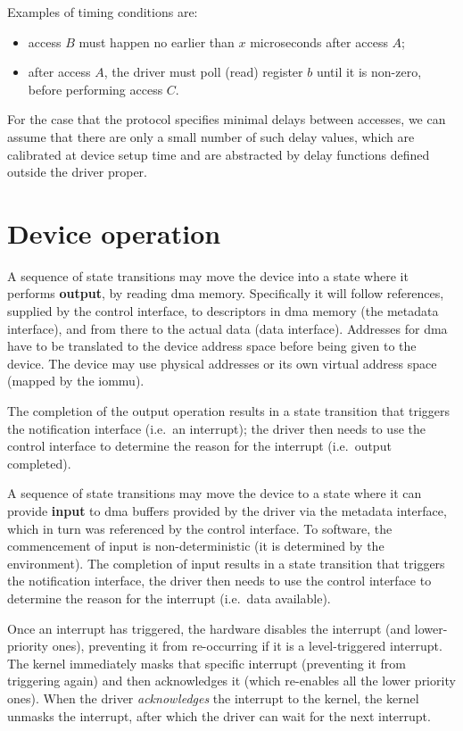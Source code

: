 \documentclass[a4paper,12pt]{report}
\begin{document}
Examples of timing conditions are:
\begin{itemize}
\item  access \(B\) must happen no earlier than \(x\) microseconds after
  access \(A\);
\item after access \(A\), the driver must poll (read) register \(b\) until it
  is non-zero, before performing access \(C\).
\end{itemize}

For the case that the protocol specifies minimal delays between
accesses, we can assume that there are only a small number of such
delay values, which are calibrated at device setup time and are
abstracted by delay functions defined outside the driver proper.

\section{Device operation}

A sequence of state transitions may move the device into a state
where it performs \textbf{output}, by reading \gls{dma} memory. Specifically it will
follow references, supplied by the control interface, to descriptors
in \gls{dma} memory (the metadata interface), and from there to the actual
data (data interface). Addresses for \gls{dma} have to be translated to the
device address space before being given to the device. The device may
use physical addresses or its own virtual address space (mapped by the \gls{iommu}).

The completion of the output operation
results in a state transition that triggers the notification interface
(i.e.\ an interrupt); the driver then needs to use the control
interface to determine the reason for the interrupt (i.e.\ output
completed).

A sequence of state transitions may move the device to a state where
it can provide \textbf{input} to \gls{dma} buffers provided by the driver via the metadata
interface, which in turn was referenced by the control interface. To
software, the commencement of input is
non-deterministic (it is determined by the environment). The completion of
input results in a state transition that triggers the notification
interface, the driver then needs to use the control interface to
determine the reason for the interrupt (i.e.\ data available).

Once an interrupt has triggered, the hardware disables the interrupt
(and lower-priority ones), preventing it from re-occurring if it is a
level-triggered interrupt. The kernel
immediately masks that specific interrupt (preventing
it from triggering again) and then acknowledges it (which re-enables
all the lower priority ones).
When the driver \emph{acknowledges} the interrupt to the
kernel, the kernel unmasks the interrupt, after which the driver can
wait for the next interrupt.
\end{document}
